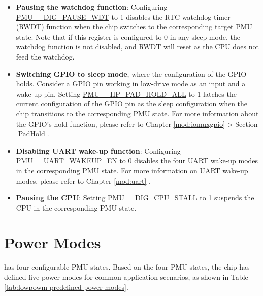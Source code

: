 \documentclass[main\_\_EN.tex]{subfiles}
\begin{document}
\begin{itemize}
    \item \textbf{Pausing the watchdog function}: Configuring \hyperref[fielddesc:PMUHPACTIVEDIGPAUSEWDT]{PMU\_\_DIG\_PAUSE\_WDT} to 1 disables the RTC watchdog timer (RWDT) function when the chip switches to the corresponding target PMU state. Note that if this register is configured to 0 in any sleep mode, the watchdog function is not disabled, and RWDT will reset as the CPU does not feed the watchdog.

    \item \textbf{Switching GPIO to sleep mode}, where the configuration of the GPIO holds. Consider a GPIO pin working in low-drive mode as an input and a wake-up pin. Setting \hyperref[fielddesc:PMUHPACTIVEHPPADHOLDALL]{PMU\_\_HP\_PAD\_HOLD\_ALL} to 1 latches the current configuration of the GPIO pin as the sleep configuration when the chip transitions to the corresponding PMU state. For more information about the GPIO's hold function, please refer to Chapter \ref{mod:iomuxgpio} \textit{} > Section \ref{PadHold}.

    \item \textbf{Disabling UART wake-up function}: Configuring \hyperref[fielddesc:PMUHPACTIVEUARTWAKEUPEN]{PMU\_\_UART\_WAKEUP\_EN} to 0 disables the four UART wake-up modes in the corresponding PMU state. For more information on UART wake-up modes, please refer to Chapter \ref{mod:uart} \textit{}.

    \item \textbf{Pausing the CPU}: Setting \hyperref[fielddesc:PMUHPACTIVEDIGCPUSTALL]{PMU\_\_DIG\_CPU\_STALL} to 1 suspends the CPU in the corresponding PMU state.
\end{itemize}

\section{Power Modes}

\chipname{} has four configurable PMU states. Based on the four PMU states, the chip has defined five power modes for common application scenarios, as shown in Table \ref{tab:lowpowm-predefined-power-modes}.
\end{document}

